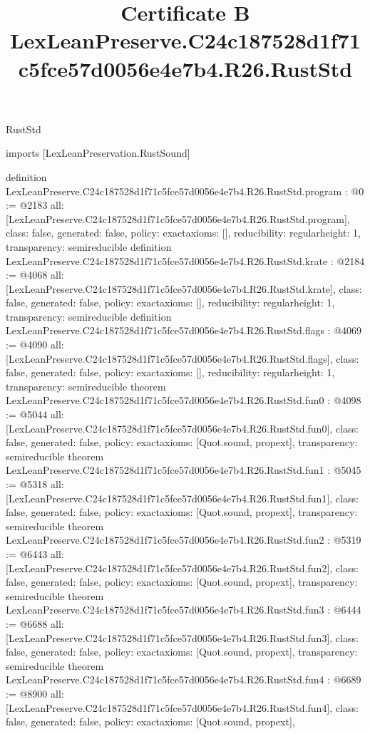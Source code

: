 \begin{lexlean}{RustStd}
\title{Certificate B LexLeanPreserve.C24c187528d1f71c5fce57d0056e4e7b4.R26.RustStd}
\begin{coremodule}
imports [LexLeanPreservation.RustSound]

definition LexLeanPreserve.C24c187528d1f71c5fce57d0056e4e7b4.R26.RustStd.program : @0 := @2183 {
  all: [LexLeanPreserve.C24c187528d1f71c5fce57d0056e4e7b4.R26.RustStd.program],
  class: false,
  generated: false,
  policy: exact{axioms: []},
  reducibility: regular{height: 1},
  transparency: semireducible
}
definition LexLeanPreserve.C24c187528d1f71c5fce57d0056e4e7b4.R26.RustStd.krate : @2184 := @4068 {
  all: [LexLeanPreserve.C24c187528d1f71c5fce57d0056e4e7b4.R26.RustStd.krate],
  class: false,
  generated: false,
  policy: exact{axioms: []},
  reducibility: regular{height: 1},
  transparency: semireducible
}
definition LexLeanPreserve.C24c187528d1f71c5fce57d0056e4e7b4.R26.RustStd.flags : @4069 := @4090 {
  all: [LexLeanPreserve.C24c187528d1f71c5fce57d0056e4e7b4.R26.RustStd.flags],
  class: false,
  generated: false,
  policy: exact{axioms: []},
  reducibility: regular{height: 1},
  transparency: semireducible
}
theorem LexLeanPreserve.C24c187528d1f71c5fce57d0056e4e7b4.R26.RustStd.fun0 : @4098 := @5044 {
  all: [LexLeanPreserve.C24c187528d1f71c5fce57d0056e4e7b4.R26.RustStd.fun0],
  class: false,
  generated: false,
  policy: exact{axioms: [Quot.sound, propext]},
  transparency: semireducible
}
theorem LexLeanPreserve.C24c187528d1f71c5fce57d0056e4e7b4.R26.RustStd.fun1 : @5045 := @5318 {
  all: [LexLeanPreserve.C24c187528d1f71c5fce57d0056e4e7b4.R26.RustStd.fun1],
  class: false,
  generated: false,
  policy: exact{axioms: [Quot.sound, propext]},
  transparency: semireducible
}
theorem LexLeanPreserve.C24c187528d1f71c5fce57d0056e4e7b4.R26.RustStd.fun2 : @5319 := @6443 {
  all: [LexLeanPreserve.C24c187528d1f71c5fce57d0056e4e7b4.R26.RustStd.fun2],
  class: false,
  generated: false,
  policy: exact{axioms: [Quot.sound, propext]},
  transparency: semireducible
}
theorem LexLeanPreserve.C24c187528d1f71c5fce57d0056e4e7b4.R26.RustStd.fun3 : @6444 := @6688 {
  all: [LexLeanPreserve.C24c187528d1f71c5fce57d0056e4e7b4.R26.RustStd.fun3],
  class: false,
  generated: false,
  policy: exact{axioms: [Quot.sound, propext]},
  transparency: semireducible
}
theorem LexLeanPreserve.C24c187528d1f71c5fce57d0056e4e7b4.R26.RustStd.fun4 : @6689 := @8900 {
  all: [LexLeanPreserve.C24c187528d1f71c5fce57d0056e4e7b4.R26.RustStd.fun4],
  class: false,
  generated: false,
  policy: exact{axioms: [Quot.sound, propext]},
}
\end{coremodule}
\end{lexlean}
